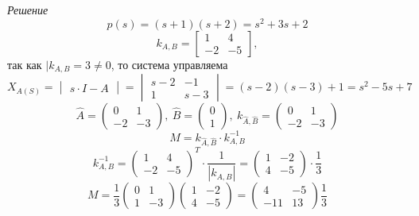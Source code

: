 \documentclass[../../TAU.tex]{subfiles}
\begin{document}
    {\it Решение}
    $$
        p(s)=(s+1)(s+2)=s^2+3s+2
    $$
    $$
        k_{A,B} = 
        \begin{bmatrix}
            1 & 4\\
            -2 & -5
        \end{bmatrix}
        ,
    $$
    так как $|k_{A,B}=3\neq0$, то система управляема
    $$
        X_{A(S)}=
        \begin{vmatrix}
            s\cdot I - A
        \end{vmatrix}
        =
        \begin{vmatrix}
            s-2 & -1\\
            1 & s-3
        \end{vmatrix}
        =(s-2)(s-3)+1 = s^2-5s+7
    $$
    $$
        \widehat A =
        \begin{pmatrix}
            0 & 1\\
            -2 & -3
        \end{pmatrix},\ 
        \widehat B=
        \begin{pmatrix}
            0 \\ 1
        \end{pmatrix},\ 
        k_{\widehat A,\widehat B} = 
        \begin{pmatrix}
            0 & 1\\
            -2 & -3
        \end{pmatrix}
    $$
    $$
        M = k_{\widehat A, \widehat B}\cdot k^{-1}_{A,B}
    $$
    $$
        k^{-1}_{A,B}=
        \begin{pmatrix}
            1 & 4\\
            -2 & -5
        \end{pmatrix}^{T}\cdot
        \frac{1}{|k_{A, B}|}
        =
        \begin{pmatrix}
            1 & -2\\
            4 & -5
        \end{pmatrix}\cdot
        \frac{1}{3}        
    $$
    $$
        M=\frac{1}{3}  
        \begin{pmatrix}
            0 & 1\\
            1 & -3
        \end{pmatrix}
        \begin{pmatrix}
            1 & -2\\
            4 & -5
        \end{pmatrix}
        =
        \begin{pmatrix}
            4 & -5\\
            -11 & 13
        \end{pmatrix}
        \frac{1}{3}  
    $$
\end{document}
